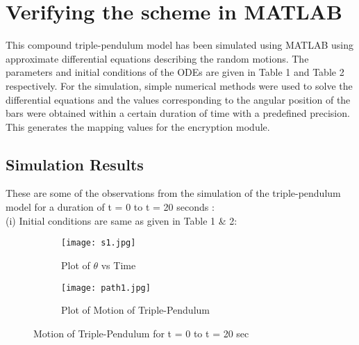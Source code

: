 % 
% 
\section{Verifying the scheme in MATLAB}
This compound triple-pendulum model has been simulated using MATLAB using approximate differential equations describing the random motions. The parameters and initial conditions of the ODEs are given in Table 1 and Table 2 respectively. For the simulation, simple numerical methods were used to solve the differential equations and the values corresponding to the angular position of the bars were obtained within a certain duration of time with a predefined precision. This generates the mapping values for the encryption module. 

% 
% 
% 
% 
\subsection{Simulation Results}
These are some of the observations from the simulation of the triple-pendulum model for a duration of t = 0 to t = 20 seconds :\\
(i) Initial conditions are same as given in Table 1 \& 2:\\
 
\begin{figure}[H]
\begin{subfigure}{0.5\textwidth}
\texttt{[image: s1.jpg]}
\caption{Plot of ${\theta}$ vs Time}\label{fig:s1}
\end{subfigure}
\begin{subfigure}{0.5\textwidth}
\texttt{[image: path1.jpg]}
\caption{Plot of Motion of Triple-Pendulum}\label{fig:path1}
\end{subfigure}
\caption{Motion of Triple-Pendulum for t = 0 to t = 20 sec}\label{fig:image2}
\end{figure}

